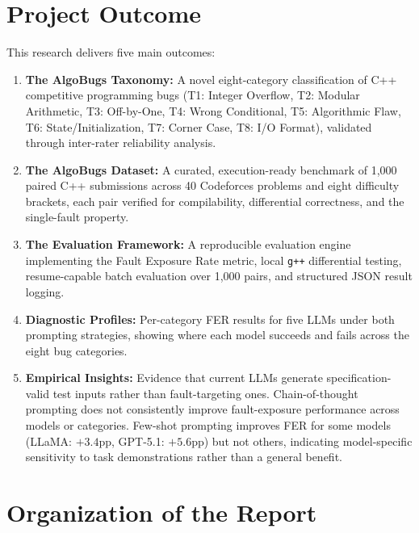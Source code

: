 \section{Project Outcome}

This research delivers five main outcomes:

\begin{enumerate}
    \item \textbf{The AlgoBugs Taxonomy:} A novel eight-category classification of C++ competitive programming bugs (T1: Integer Overflow, T2: Modular Arithmetic, T3: Off-by-One, T4: Wrong Conditional, T5: Algorithmic Flaw, T6: State/Initialization, T7: Corner Case, T8: I/O Format), validated through inter-rater reliability analysis.

    \item \textbf{The AlgoBugs Dataset:} A curated, execution-ready benchmark of 1,000 paired C++ submissions across 40 Codeforces problems and eight difficulty brackets, each pair verified for compilability, differential correctness, and the single-fault property.

    \item \textbf{The Evaluation Framework:} A reproducible evaluation engine implementing the Fault Exposure Rate metric, local \texttt{g++} differential testing, resume-capable batch evaluation over 1,000 pairs, and structured JSON result logging.

    \item \textbf{Diagnostic Profiles:} Per-category FER results for five LLMs under both prompting strategies, showing where each model succeeds and fails across the eight bug categories.

    \item \textbf{Empirical Insights:} Evidence that current LLMs generate specification-valid test inputs rather than fault-targeting ones. Chain-of-thought prompting does not consistently improve fault-exposure performance across models or categories. Few-shot prompting improves FER for some models (LLaMA: $+3.4$pp, GPT-5.1: $+5.6$pp) but not others, indicating model-specific sensitivity to task demonstrations rather than a general benefit.
\end{enumerate}

\section{Organization of the Report}

